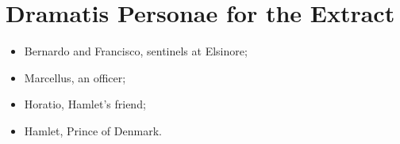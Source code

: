 \section*{Dramatis Personae for the Extract}
\begin{itemize}
  \item Bernardo and Francisco, sentinels at Elsinore;
  \item Marcellus, an officer;
  \item Horatio, Hamlet's friend;
  \item Hamlet, Prince of Denmark.
\end{itemize}
